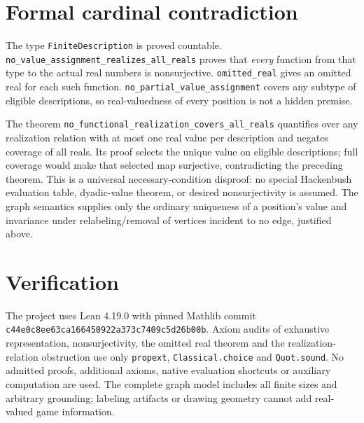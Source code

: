 \documentclass[10pt,a4paper]{article}
\begin{document}
\section*{Formal cardinal contradiction}
The type \texttt{FiniteDescription} is proved countable.
\texttt{no\_value\_assignment\_realizes\_all\_reals} proves that
\emph{every} function from that type to the actual real numbers is
nonsurjective. \texttt{omitted\_real} gives an omitted real for each
such function. \texttt{no\_partial\_value\_assignment} covers any
subtype of eligible descriptions, so real-valuedness of every position
is not a hidden premise.

The theorem \texttt{no\_functional\_realization\_covers\_all\_reals}
quantifies over any realization relation with at most one real value
per description and negates coverage of all reals. Its proof selects
the unique value on eligible descriptions; full coverage would make
that selected map surjective, contradicting the preceding theorem.
This is a universal necessary-condition disproof: no special
Hackenbush evaluation table, dyadic-value theorem, or desired
nonsurjectivity is assumed. The graph semantics supplies only the
ordinary uniqueness of a position's value and invariance under
relabeling/removal of vertices incident to no edge, justified above.

\section*{Verification}
The project uses Lean 4.19.0 with pinned Mathlib commit
\texttt{c44e0c8ee63ca166450922a373c7409c5d26b00b}.
Axiom audits of exhaustive representation, nonsurjectivity, the omitted
real theorem and the realization-relation obstruction use only
\texttt{propext}, \texttt{Classical.choice} and \texttt{Quot.sound}.
No admitted proofs, additional axioms, native evaluation shortcuts or
auxiliary computation are used. The complete graph model includes all
finite sizes and arbitrary grounding; labeling artifacts or drawing
geometry cannot add real-valued game information.
\end{document}
